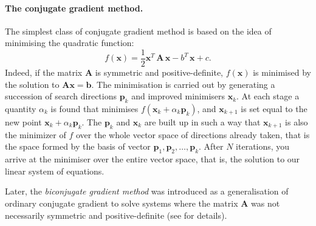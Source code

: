 \paragraph*{The conjugate gradient method.}		
The simplest class of conjugate gradient method is based on the idea of minimising the quadratic function:
\begin{equation}
f(\mathbf{x}) = \frac{1}{2} \mathbf{x}^T \, \mathbf{A} \, \mathbf{x} - b^T \, \mathbf{x} + c.
\end{equation}
Indeed, if the matrix $ \mathbf{A} $ is symmetric and positive-definite, $ f(\mathbf{x}) $ is minimised by the solution to $ \mathbf{A} \mathbf{x} = \mathbf{b} $\citep{Shewchuk94}. The minimisation is carried out by generating a succession of search directions $ \mathbf{p} _k $ and improved minimisers $ \mathbf{x} _k $. At each stage a quantity $ \alpha_k $ is found that minimises $f(\mathbf{x}_k  + \alpha_k \mathbf{p}_k)$, and $\mathbf{x}_{k+1}$ is set equal to the new point $\mathbf{x}_k + \alpha_k \mathbf{p}_k$. The $ \mathbf{p}_k $  and $ \mathbf{x}_k $  are built up in such a way that $ \mathbf{x}_{k+1} $  is also the minimizer of $ f $ over the whole vector space of directions already taken, that is the space formed by the basis of vector ${\mathbf{p}_1, \mathbf{p}_2, \ldots, \mathbf{p}_k }$. After $N$ iterations, you arrive at the minimiser over the entire vector space, that is, the solution to our linear system of equations. 

Later, the \emph{biconjugate gradient method} was introduced as a generalisation of ordinary conjugate gradient to solve systems where the matrix $ \mathbf{A} $ was not necessarily symmetric and positive-definite (see \cite{Belytschko00} for details). 	